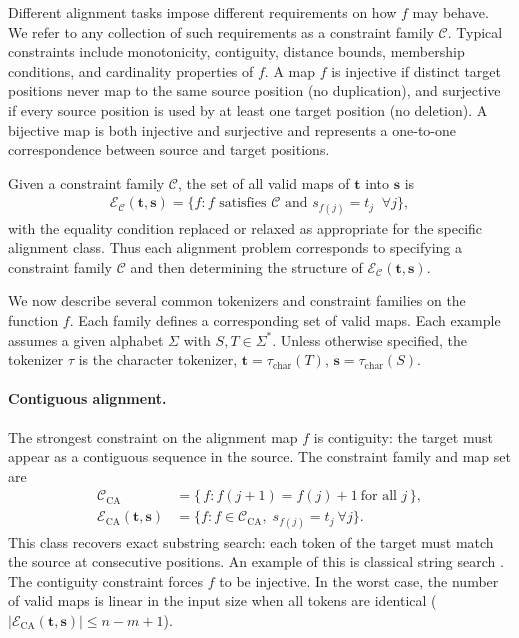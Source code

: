 Different alignment tasks impose different requirements on how $f$ may behave.
We refer to any collection of such requirements as a constraint family $\mathcal{C}$. Typical constraints include monotonicity, contiguity, distance bounds, membership conditions, and cardinality properties of $f$. A map $f$ is injective if distinct target positions never map to the same source position (no duplication), and surjective if every source position is used by at least one target position (no deletion). A bijective map is both injective and surjective and represents a one-to-one correspondence between source and target positions.

Given a constraint family $\mathcal{C}$, the set of all valid maps of
$\mathbf{t}$ into $\mathbf{s}$ is
\begin{align}
\mathcal{E}_{\mathcal{C}}(\mathbf{t},\mathbf{s})
=
\big\{
f : f \text{ satisfies } \mathcal{C} \text{ and } s_{f(j)} = t_j \;\; \forall j
\big\},
\end{align}
with the equality condition replaced or relaxed as appropriate for the specific alignment class. Thus each alignment problem corresponds to specifying a constraint family $\mathcal{C}$ and then determining the structure of $\mathcal{E}_{\mathcal{C}}(\mathbf{t},\mathbf{s})$.

We now describe several common tokenizers and constraint families on the function $f$. Each family defines a corresponding set of valid maps. Each example assumes a given alphabet $\Sigma$ with $S,T\in\Sigma^*$. Unless otherwise specified, the tokenizer $\tau$ is the character tokenizer, $\mathbf{t} = \tau_{\mathrm{char}}(T)$, $\mathbf{s} = \tau_{\mathrm{char}}(S).$

\paragraph{Contiguous alignment.}
The strongest constraint on the alignment map $f$ is contiguity: the target must appear as a contiguous sequence in the source. The constraint family and map set are
\begin{align}
\mathcal{C}_{\mathrm{CA}}
&=
\{\, f : f(j{+}1) = f(j)+1 \ \text{for all } j \,\}, \\
\mathcal{E}_{\mathrm{CA}}(\mathbf{t},\mathbf{s})
&=
\big\{
f : f \in \mathcal{C}_{\mathrm{CA}},\;
s_{f(j)} = t_j \ \forall j
\big\}.
\end{align}
This class recovers exact substring search: each token of the target must match the source at consecutive positions. An example of this is classical string search \citep{KnuthMorrisPratt1977}. The contiguity constraint forces $f$ to be injective. In the worst case, the number of valid maps is linear in the input size when all tokens are identical ($|\mathcal{E}_{\mathrm{CA}}(\mathbf{t},\mathbf{s})| \le n-m+1$).

